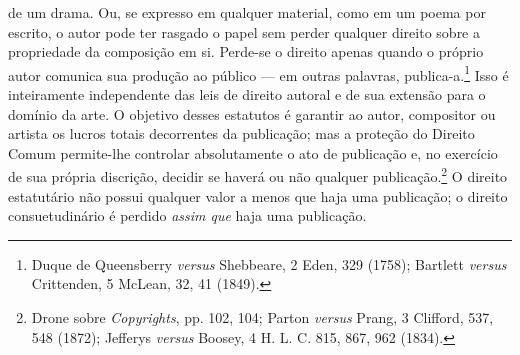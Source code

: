 de um drama. Ou, se expresso em qualquer material, como em um poema por
escrito, o autor pode ter rasgado o papel sem perder qualquer direito
sobre a propriedade da composição em si. Perde-se o direito apenas
quando o próprio autor comunica sua produção ao público --- em outras
palavras, publica-a.\footnote{Duque de Queensberry \emph{versus}
  Shebbeare, 2 Eden, 329 (1758); Bartlett \emph{versus} Crittenden, 5
  McLean, 32, 41 (1849).} Isso é inteiramente independente das leis de
direito autoral e de sua extensão para o domínio da arte. O objetivo
desses estatutos é garantir ao autor, compositor ou artista os lucros
totais decorrentes da publicação; mas a proteção do Direito Comum
permite-lhe controlar absolutamente o ato de publicação e, no exercício
de sua própria discrição, decidir se haverá ou não qualquer
publicação.\footnote{Drone sobre \emph{Copyrights}, pp. 102, 104; Parton
  \emph{versus} Prang, 3 Clifford, 537, 548 (1872); Jefferys
  \emph{versus} Boosey, 4 H. L. C. 815, 867, 962 (1834).} O direito
estatutário não possui qualquer valor a menos que haja uma publicação; o
direito consuetudinário é perdido \emph{assim que} haja uma publicação.

